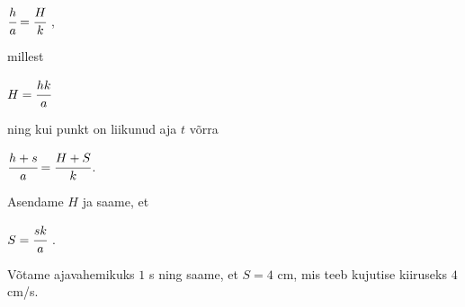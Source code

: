 {\begin{center}
$\cfrac{h}{a} = \cfrac{H}{k}$ , 
\end{center}
millest
\begin{center}
$H = \cfrac{hk}{a}$
\end{center}
ning kui punkt on liikunud aja $t$ võrra 
\begin{center}
$\cfrac {h + s}{a} = \cfrac {H + S}{k}$. 
\end{center}
Asendame $H$ ja saame, et 
\begin{center}
$S = \cfrac {sk}{a}$ . 
\end{center}
Võtame ajavahemikuks $1$ s ning saame, et $S = 4$ cm, mis teeb kujutise kiiruseks $4$ cm/s. 
\fi
}